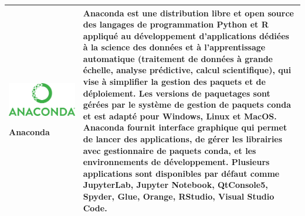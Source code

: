 \begin{table}[H]
\begin{tabular}{|m{5cm}|m{12cm}|}
  \begin{center}
	    \begin{minipage}{.3\textwidth}
      \includegraphics[width=\textwidth]{images/chapitre7/anaconda.png}
    \end{minipage}
	\end{center}
	\centering \textbf{Anaconda} & Anaconda \cite{anaconda_citation} est une distribution libre et open source \cite{anaconda_website} des langages de programmation Python et R appliqué au développement d'applications dédiées à la science des données et à l'apprentissage automatique (traitement de données à grande échelle, analyse prédictive, calcul scientifique), qui vise à simplifier la gestion des paquets et de déploiement. Les versions de paquetages sont gérées par le système de gestion de paquets conda \cite{conda_website} et est adapté pour Windows, Linux et MacOS. Anaconda fournit interface graphique qui permet de lancer des applications, de gérer les librairies avec gestionnaire de paquets conda, et les environnements de développement. Plusieurs applications sont disponibles par défaut comme JupyterLab, Jupyter Notebook, QtConsole5, Spyder, Glue, Orange, RStudio, Visual Studio Code.  \\ \hline
  

\end{tabular}
\end{table}
